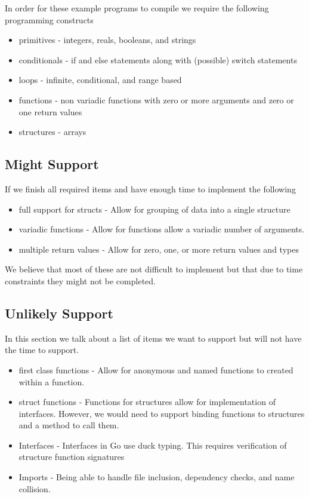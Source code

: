 \documentclass{article}
\begin{document}
\noindent In order for these example programs to compile we require the following programming constructs

\begin{itemize}
    \item primitives    - integers, reals, booleans, and strings
    \item conditionals  - if and else statements along with (possible) switch statements
    \item loops         - infinite, conditional, and range based
    \item functions     - non variadic functions with zero or more arguments and zero or one return values
    \item structures    - arrays 
\end{itemize} 

\subsection{Might Support}

If we finish all required items and have enough time to implement the following 

\begin{itemize}
    \item full support for structs  - Allow for grouping of data into a single structure
    \item variadic functions        - Allow for functions allow a variadic number of arguments.
    \item multiple return values    - Allow for zero, one, or more return values and types
\end{itemize}
 
We believe that most of these are not difficult to implement but that due to time constraints they might not be completed.

\subsection{Unlikely Support} 

In this section we talk about a list of items we want to support but will not have the time to support.

\begin{itemize}
    \item first class functions     - Allow for anonymous and named functions to created within a function.
    \item struct functions  - Functions for structures allow for implementation of interfaces.  However, we would need to support binding functions to structures and a method to call them.
    \item Interfaces        - Interfaces in Go use duck typing. This requires verification of structure function signatures  
    \item Imports           - Being able to handle file inclusion, dependency checks, and name collision. 
\end{itemize}
\end{document}
